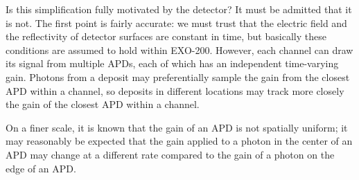 Is this simplification fully motivated by the detector?  It must be admitted that it is not.  The first point is fairly accurate:  we must trust that the electric field and the reflectivity of detector surfaces are constant in time, but basically these conditions are assumed to hold within EXO-200.  However, each channel can draw its signal from multiple APDs, each of which has an independent time-varying gain.  Photons from a deposit may preferentially sample the gain from the closest APD within a channel, so deposits in different locations may track more closely the gain of the closest APD within a channel.

On a finer scale, it is known that the gain of an APD is not spatially uniform; it may reasonably be expected that the gain applied to a photon in the center of an APD may change at a different rate compared to the gain of a photon on the edge of an APD.










